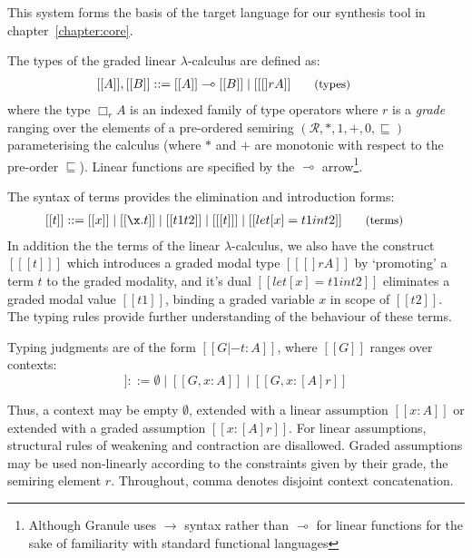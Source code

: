 This system forms the basis of the target language for our synthesis tool in
chapter~\ref{chapter:core}. 

The types of the graded linear $\lambda$-calculus are defined as:
\begin{align*}
\hspace{-0.9em}[[ A ]] , [[ B ]] & ::=
       [[ A ]] \multimap [[ B ]]
  \mid [[ [] r A ]]
{\small{\tag{types}}}
\end{align*}
where the type $\Box_{r} A$ is an indexed family of type operators where $r$ is a
\textit{grade} ranging over the elements of a pre-ordered semiring
$({\mathcal{R}}, {*}, {1}, {+}, {0},
{\sqsubseteq})$ parameterising the calculus (where $\ast$ and $+$
are monotonic with respect to the pre-order $\sqsubseteq$). Linear functions 
are specified by the $\multimap$ arrow\footnote{Although Granule uses $\rightarrow$ syntax rather than
$\multimap$ for linear functions for the sake of familiarity with
standard functional languages}.

The syntax of terms provides the elimination and introduction forms:
\begin{align*}
\hspace{-0.8em} [[ t ]] ::= \;
       & [[ x ]]
  \mid [[ \x . t ]]
  \mid [[ t1 t2 ]]
  \mid [[ [t] ]]
  \mid [[ let [ x ] = t1 in t2 ]]
{\small{\tag{terms}}}
\end{align*}
In addition the the terms of the linear $\lambda$-calculus, we also have the
construct $[[ [t] ]]$ which introduces a graded modal type $[[ [] r A
]]$ by `promoting' a term $t$ to the graded modality, and it's dual $[[ let [x] = t1
in t2 ]]$ eliminates a graded modal value $[[ t1 ]]$, binding a graded variable $x$
in scope of $[[ t2 ]]$. The typing rules provide further understanding of the
behaviour of these terms.

Typing judgments are of the form $[[ G |- t : A ]]$, where $[[ G ]]$ ranges over contexts:
\begin{equation*}
  [[ G ]] ::= \emptyset
  \mid [[ G , x : A ]]
  \mid [[ G , x : [ A ] r ]]
\tag{contexts}
\end{equation*}

Thus, a context may be empty $\emptyset$, extended with a
linear assumption $[[ x : A ]]$ or extended with a graded assumption $[[x : [A]
r]]$. For linear assumptions, structural rules of weakening
and contraction are disallowed. Graded assumptions may be used
non-linearly according to the constraints given by their grade, the
semiring element $r$. Throughout, comma denotes disjoint context
concatenation.

